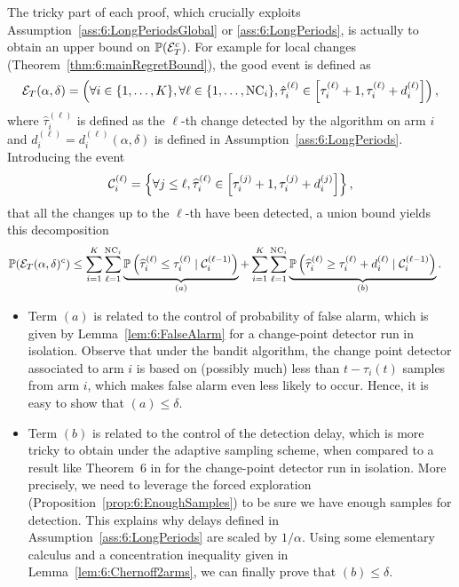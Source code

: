 The tricky part of each proof, which crucially exploits Assumption~\ref{ass:6:LongPeriodsGlobal} or \ref{ass:6:LongPeriods}, is actually to obtain an upper bound on $\mathbb{P}(\mathcal{E}_T^c)$. For example for local changes (Theorem~\ref{thm:6:mainRegretBound}), the good event is defined as
\begin{equation}
    \mathcal{E}_T(\alpha,\delta) = \left(\forall i \in \{1, \ldots, K\}, \forall \ell \in \{1, \ldots, \text{NC}_i\}, \hat{\tau}^{(\ell)}_i \in \left[\tau_i^{(\ell)} + 1, \tau_i^{(\ell)} + d_i^{(\ell)}\right] \right),
\end{equation}
%
where $\widehat{\tau}_i^{(\ell)}$ is defined as the $\ell$-th change detected by the algorithm on arm $i$ and $d_i^{(\ell)}=d_i^{(\ell)}(\alpha,\delta)$ is defined in Assumption~\ref{ass:6:LongPeriods}.
Introducing the event
\[\mathcal{C}_i^{(\ell)} = \left\{\forall j \leq \ell, \widehat{\tau}_i^{(\ell)} \in \left[\tau_i^{(j)} + 1, \tau_i^{(j)} + d_i^{(j)} \right] \right\},\]
that all the changes up to the $\ell$-th have been detected, a union bound yields this decomposition
%
\begin{align}
    \mathbb{P}(\mathcal{E}_T(\alpha,\delta)^c) & \leq \sum\limits_{i=1}^K\sum\limits_{\ell=1}^{\text{NC}_i} \underbrace{\mathbb{P}\left(\widehat{\tau}_i^{(\ell)} \leq \tau_i^{(\ell)} \;|\; \mathcal{C}_i^{(\ell-1)}\right)}_{(a)} + \sum\limits_{i=1}^K\sum\limits_{\ell=1}^{\text{NC}_i} \underbrace{\mathbb{P}\left(\widehat{\tau}_i^{(\ell)} \geq \tau_i^{(\ell)} + d_i^{(\ell)} \;|\; \mathcal{C}_i^{(\ell-1)}\right)}_{(b)}.
\end{align}

\begin{itemize}
\item
Term $(a)$ is related to the control of probability of false alarm, which is given by Lemma~\ref{lem:6:FalseAlarm} for a change-point detector run in isolation.
Observe that under the bandit algorithm, the change point detector associated to arm $i$ is based on (possibly much) less than $t - \tau_i(t)$ samples from arm $i$, which makes false alarm even less likely to occur. Hence, it is easy to show that $(a) \leq \delta$.

\item
Term $(b)$ is related to the control of the detection delay, which is more tricky to obtain under the \GLRklUCB{} adaptive sampling scheme,
when compared to a result like Theorem~6 in \cite{Maillard2018GLR} for the change-point detector run in isolation.
%
More precisely, we need to leverage the forced exploration (Proposition~\ref{prop:6:EnoughSamples}) to be sure we have enough samples for detection. This explains why delays defined in Assumption~\ref{ass:6:LongPeriods} are scaled by $1/\alpha$.
Using some elementary calculus and a concentration inequality given in Lemma~\ref{lem:6:Chernoff2arms}, we can finally prove that $(b) \leq \delta$.
\end{itemize}


